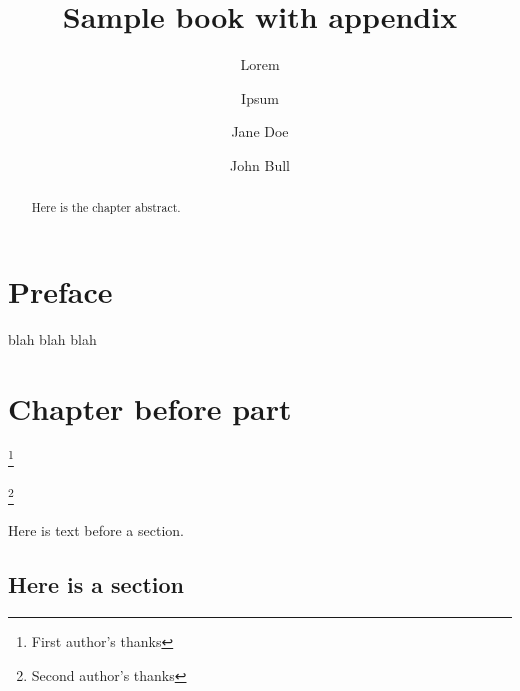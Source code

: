 \documentclass[collection]{surv-l}
\title{Sample book with appendix}
\author{Lorem}
\author{Ipsum}
\begin{document}
\frontmatter

\tableofcontents

\chapter*{Preface}

\maketitle

blah blah blah

\mainmatter

\chapter{Chapter before part}



\author{Jane Doe}

\address{First author's address}

\thanks{First author's thanks}




\ifx\MRauthid\undefined\else
{}
\fi


\author{John Bull}

\address{Second author's address}

\thanks{Second author's thanks}



\begin{abstract}
Here is the chapter abstract.
\end{abstract}

\maketitle

Here is text before a section.

\section{Here is a section}

\begin{bibsection}

\begin{biblist}


\end{biblist}

\end{bibsection}
\end{document}
